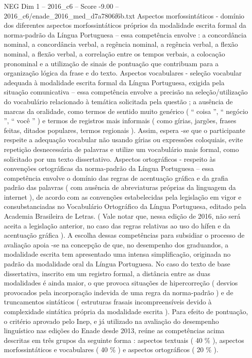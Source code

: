 \begin{textsample}{NEG Dim 1 – 2016\_c6 – Score -9.00 – 2016\_c6/enade\_2016\_med\_d7a7806f6b.txt}
Aspectos morfossintáticos - domínio dos diferentes aspectos morfossintáticos próprios da modalidade escrita formal da norma-padrão da Língua Portuguesa – essa competência envolve : a concordância nominal, a concordância verbal, a regência nominal, a regência verbal, a flexão nominal, a flexão verbal, a correlação entre os tempos verbais, a colocação pronominal e a utilização de sinais de pontuação que contribuam para a organização lógica da frase e do texto.
Aspectos vocabulares - seleção vocabular adequada à modalidade escrita formal da Língua Portuguesa, exigida pela situação comunicativa – essa competência envolve a precisão na seleção/utilização do vocabulário relacionado à temática solicitada pela questão ; a ausência de marcas da oralidade, como termos de sentido muito genérico ( “ coisa ”, “ negócio ”, “ você ” ) e termos de registros mais informais ( como gírias, jargões, frases feitas, ditados populares, termos regionais ).
Assim, espera -se que o participante respeite a adequação vocabular não usando gírias ou expressões coloquiais, evite repetição desnecessária de palavras e utilize um vocabulário mais formal, como solicitado por um texto dissertativo.
Aspectos ortográficos - respeito às convenções ortográficas da norma-padrão da Língua Portuguesa – essa competência envolve o domínio das regras de acentuação gráfica e da grafia padrão das palavras ( com ausência de abreviaturas próprias da linguagem da internet ), de acordo com as convenções estabelecidas pela legislação em vigor e consubstanciadas no Vocabulário Ortográfico da Língua Portuguesa, editado pela Academia Brasileira de Letras. ( Vale notar que, nessa edição de 2016, não será aceita a legislação anterior, no caso das regras relativas ao uso do hífen e da acentuação gráfica ).
A escolha dessas competências para subsidiar o processo de avaliação apoia -se na concepção de que, no desempenho dos graduandos, a modalidade escrita tem apresentado uma intensa simplificação, originada no padrão da modalidade oral da Língua Portuguesa.
No caso do texto de base dissertativa, inscrito em um registro formal, a distância entre as duas modalidades é ainda maior, o que provoca situações de hipercorreção ( desvios provocados pela incorporação indevida de uma regra da norma-padrão ) e de truncamentos sintáticos ( estruturas frasais incompreensíveis devido à complexidade sintática própria da modalidade escrita ).
Para efeito de pontuação, o critério aprovado pelo Inep, e já utilizado na avaliação do desempenho linguístico nas edições do Enade desde 2013, reúne as competências acima descritas em três grupos da seguinte forma : aspectos textuais ( 40 \% ), aspectos morfossintáticos e vocabulares ( 40 \% ) e aspectos ortográficos ( 20 \% ).

\end{textsample}
